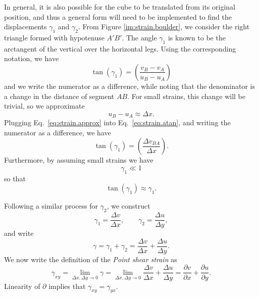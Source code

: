 In general, it is also possible for the cube to be translated from its original position, and thus a general form will need to be implemented to find the displacements $\gamma_1$ and $\gamma_2$. From Figure \ref{im:strain.boulder}, we consider the right triangle formed with hypotenuse $A'B'$. The angle $\gamma_1$ is known to be the arctangent of the vertical over the horizontal legs. Using the corresponding notation, we have
\begin{equation}
\tan{(\gamma_1)} = \left(\frac{v_B-v_A}{u_B-u_A}\right)
\label{eq:strain.atan}
\end{equation}
and we write the numerator as a difference, while noting that the denominator is a change in the distance of segment $AB$. For small strains, this change will be trivial, so we approximate
\begin{equation}
u_B-u_A\approx\Delta x.
\label{eq:strain.approx}
\end{equation}
Plugging Eq.~\ref{eq:strain.approx} into Eq.~\ref{eq:strain.atan}, and writing the numerator as a difference, we have
\begin{equation}
\tan{(\gamma_1)} = \left(\frac{\Delta v_{BA}}{\Delta x}\right).
\end{equation}
Furthermore, by assuming small strains we have
\begin{equation}
\label{eq:shear.assump}
\gamma_1\ll1
\end{equation}
so that 
\begin{equation}
\tan{(\gamma_1)}\approx\gamma_1.
\end{equation}

Following a similar process for $\gamma_2$, we construct
\begin{equation}
\gamma_1 = \frac{\Delta v}{\Delta x},\qquad\gamma_2 = \frac{\Delta u}{\Delta y},
\end{equation}
and write
\begin{equation}
\gamma = \gamma_1+\gamma_2 = \frac{\Delta v}{\Delta x}+\frac{\Delta u}{\Delta y}.
\end{equation}
We now write the definition of the \emph{Point shear strain} as
\begin{equation}
\label{eq:shear.linear}
\gamma_{xy} = \lim_{\Delta x,\Delta y\to 0}\gamma = \lim_{\Delta x,\Delta y\to 0}\frac{\Delta v}{\Delta x}+\frac{\Delta u}{\Delta y} = \frac{\partial v}{\partial x} + \frac{\partial u}{\partial y}.
\end{equation}
Linearity of $\partial$ implies that $\gamma_{xy}=\gamma_{yx}$.

